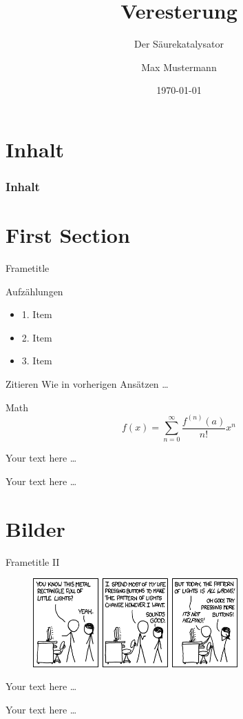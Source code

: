 \documentclass[compress,aspectratio=1610]{beamer}
\title{Veresterung}
\subtitle{Der Säurekatalysator}
\date{\today}
\author{Max Mustermann}
\institute[]{
  Fachhochschule Dortmund \\
  FB 10: Informationstechnik
}
\begin{document}
\maketitle

\section*{Inhalt}
\begin{frame}
  \frametitle{Inhalt}
  \centering
  \tableofcontents[hideallsubsections]
\end{frame}

\section{First Section}
\begin{frame}{Frametitle}
  \begin{block}{Aufzählungen}
    \begin{itemize}
    \item 1. Item
    \item 2. Item
    \item 3. Item
    \end{itemize}
  \end{block}
  \begin{block}{Zitieren}
    Wie in vorherigen Ansätzen \cite{Veresterung} \dots
  \end{block}
  \begin{block}{Math}
    $$f(x) = \sum\limits_{n=0}^{\infty}\frac{f^{(n)}(a)}{n!}x^n$$
  \end{block}
\end{frame}
\begin{frame}
  Your text here \dots
\end{frame}
\begin{frame}
  Your text here \dots
\end{frame}

\section{Bilder}
\begin{frame}{Frametitle II}
  \begin{figure}[!h]
    \centering
    \includegraphics[width=0.7\textwidth]{figures/computer_problems.png}
  \end{figure}
\end{frame}
\begin{frame}
   Your text here \dots
\end{frame}
\begin{frame}
  Your text here \dots
\end{frame}
\end{document}

